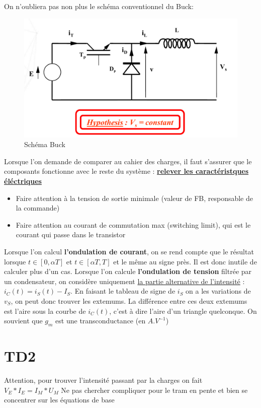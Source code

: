 \documentclass[french,10pt,a4paper]{article}
\begin{document}
On n'oubliera pas non plus le schéma conventionnel du Buck:
\begin{figure}[!h]
	\centering
	\includegraphics[width=0.7\linewidth]{Buck}
	\caption{Schéma Buck}
	\label{fig:buck}
\end{figure}
\newline Lorsque l'on demande de comparer au cahier des charges, il faut s'assurer que le composants fonctionne avec le reste du système : \textbf{\underline{relever les caractéristques éléctriques}}\newline
\begin{itemize}
	\item Faire attention à la tension de sortie minimale (valeur de FB, responsable de la commande)
	 \item Faire attention au courant de commutation max (switching limit), qui est le courant qui passe dans le transistor
\end{itemize}
Lorsque l'on calcul \textbf{l'ondulation de courant}, on se rend compte que le résultat lorsque $t\in[0,{\alpha}T]$ et $t\in[{\alpha}T, T]$ et le même au signe près. Il est donc inutile de calculer plus d'un cas.\newline\newline
Lorsque l'on calcule \textbf{l'ondulation de tension} filtrée par un condensateur, on considère uniquement \newline\underline{la partie alternative de l'intensité} : $i_C(t) = i_S(t) - I_S$. En faisant le tableau de signe de $i_S$ on a les variations de $v_S$, on peut donc trouver les extemums. La différence entre ces deux extemums est l'aire sous la courbe de $i_C(t)$, c'est à dire l'aire d'un triangle quelconque.\newline
On souvient que $g_m$ est une transconductance (en $A.V^{-1}$)
\section{TD2 }
Attention, pour trouver l'intensité passant par la charges on fait $V_{E}*I_E=I_M*U_M$\newline
Ne pas chercher compliquer pour le tram en pente et bien se concentrer sur les équations de base
\end{document}
